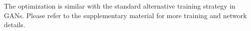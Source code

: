 \documentclass[10pt,twocolumn,letterpaper]{article}
\begin{document}
The optimization is similar with the standard alternative training strategy in GANs. Please refer to the supplementary material for more training and network details.









%			
\end{document}
